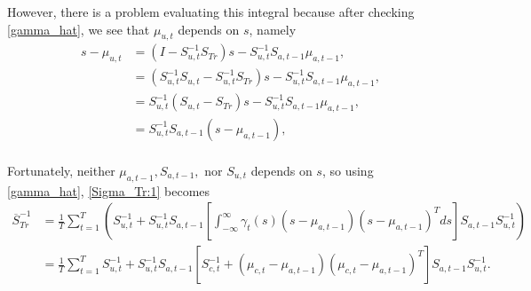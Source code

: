 \documentclass[12pt,leqno]{article}
\begin{document}
However, there is a problem evaluating this integral because after checking \eqref{gamma_hat}, we see that $\mu_{u,t}$
depends on $s$, namely  
\begin{equation}\label{s-mu_1}
  \begin{split}
    s-\mu_{u,t} &= (I - S_{u,t}^{-1}S_{Tr})s - S_{u,t}^{-1}S_{a,t-1}\mu_{a,t-1}, \\
    &= (S_{u,t}^{-1}S_{u,t} - S_{u,t}^{-1}S_{Tr})s - S_{u,t}^{-1}S_{a,t-1}\mu_{a,t-1}, \\
    &= S_{u,t}^{-1}(S_{u,t} - S_{Tr})s - S_{u,t}^{-1}S_{a,t-1}\mu_{a,t-1}, \\
    &= S_{u,t}^{-1}S_{a,t-1}(s - \mu_{a,t-1}),\\
  \end{split}
\end{equation}


Fortunately, neither $\mu_{a,t-1},S_{a,t-1},$ nor $S_{u,t}$ depends on $s$,
so using \eqref{gamma_hat}, \eqref{Sigma_Tr:1} becomes
\begin{equation}\label{S_Tr:2}
  \begin{split}
  \overline{S}_{Tr}^{-1} &=\frac{1}{T}\sum_{t=1}^T\left(S_{u,t}^{-1} +S_{u,t}^{-1}S_{a,t-1}
  \left[\int_{-\infty}^{\infty}\gamma_t(s)(s-\mu_{a,t-1})(s-\mu_{a,t-1})^Tds\right]S_{a,t-1}S_{u,t}^{-1}\right)\\
   &=\frac{1}{T}\sum_{t=1}^TS_{u,t}^{-1}+S_{u,t}^{-1}S_{a,t-1}
   [S_{c,t}^{-1}+(\mu_{c,t}-\mu_{a,t-1})(\mu_{c,t}-\mu_{a,t-1})^T]S_{a,t-1}S_{u,t}^{-1}.
  \end{split}
\end{equation}
\end{document}
